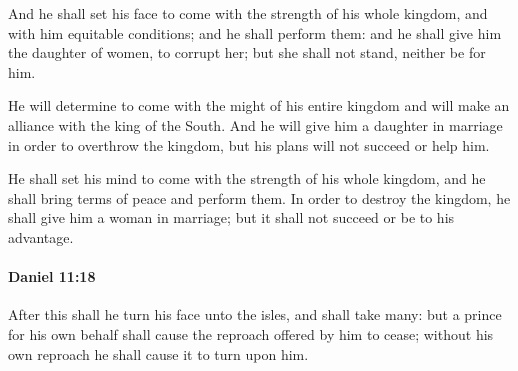 			\begin{versebox}
					\item[BHS] 
					\item[LXX] 
					\item[ASV] And he shall set his face to come with the strength of his whole kingdom, and with him equitable conditions; and he shall perform them: and he shall give him the daughter of women, to corrupt her; but she shall not stand, neither be for him.
					\item[NIV] He will determine to come with the might of his entire kingdom and will make an alliance with the king of the South. And he will give him a daughter in marriage in order to overthrow the kingdom, but his plans will not succeed or help him.
					\item[NRSV] He shall set his mind to come with the strength of his whole kingdom, and he shall bring terms of peace and perform them. In order to destroy the kingdom, he shall give him a woman in marriage; but it shall not succeed or be to his advantage.
			\end{versebox}

		\paragraph{Daniel 11:18} %
			\label{DANIEL-11-18}

			After this shall he turn his face unto the isles, and shall take many: but a prince for his own behalf shall cause the reproach offered by him to cease; without his own reproach he shall cause it to turn upon him.

